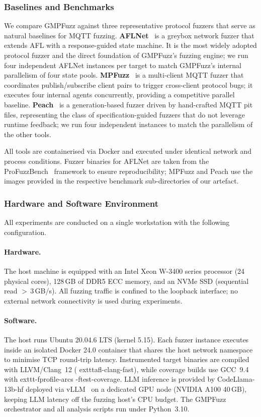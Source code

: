 \subsubsection{Baselines and Benchmarks}
\label{subsubsec:baselines}

We compare GMPFuzz against three representative protocol fuzzers that serve as
natural baselines for MQTT fuzzing.
\textbf{AFLNet}~\cite{aflnet} is a greybox network fuzzer that extends AFL
with a response-guided state machine.  It is the most widely adopted
protocol fuzzer and the direct foundation of GMPFuzz's fuzzing engine;
we run four independent AFLNet instances per target to match GMPFuzz's
internal parallelism of four state pools.
\textbf{MPFuzz}~\cite{mpfuzz} is a multi-client MQTT fuzzer that
coordinates publish/subscribe client pairs to trigger cross-client protocol
bugs; it executes four internal agents concurrently, providing a
competitive parallel baseline.
\textbf{Peach}~\cite{peach} is a generation-based fuzzer driven by
hand-crafted MQTT pit files, representing the class of specification-guided
fuzzers that do not leverage runtime feedback; we run four independent
instances to match the parallelism of the other tools.

All tools are containerised via Docker and executed under identical
network and process conditions.  Fuzzer binaries for AFLNet are taken from the
ProFuzzBench~\cite{profuzzbench} framework to ensure reproducibility; MPFuzz
and Peach use the images provided in the respective benchmark sub-directories
of our artefact.

\subsubsection{Hardware and Software Environment}
\label{subsubsec:env}

All experiments are conducted on a single workstation with the following
configuration.

\paragraph{Hardware.}
The host machine is equipped with an Intel Xeon W-3400 series processor
(24 physical cores), 128\,GB of DDR5 ECC memory, and an NVMe SSD
(sequential read $>$\,3\,GB/s).  All fuzzing traffic is confined to the
loopback interface; no external network connectivity is used during
experiments.

\paragraph{Software.}
The host runs Ubuntu 20.04.6 LTS (kernel 5.15).  Each fuzzer instance
executes inside an isolated Docker 24.0 container that shares the host
network namespace to minimise TCP round-trip latency.  Instrumented target
binaries are compiled with LLVM/Clang~12 (	exttt{afl-clang-fast}),
while coverage builds use GCC~9.4 with 	exttt{-fprofile-arcs
-ftest-coverage}.  LLM inference is provided by CodeLlama-13b-hf
deployed via vLLM~\cite{vllm} on a dedicated GPU node (NVIDIA A100
40\,GB), keeping LLM latency off the fuzzing host's CPU budget.
The GMPFuzz orchestrator and all analysis scripts run under Python~3.10.

